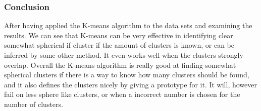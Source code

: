 \documentclass[10pt,a4paper]{article}
\begin{document}
\subsubsection{Conclusion}
After having applied the K-means algorithm to the data sets and examining the results. We can see that K-means can be very effective in identifying clear somewhat spherical if cluster if the amount of clusters is known, or can be inferred by some other method. It even works well when the clusters strongly overlap.
Overall the K-means algorithm is really good at finding somewhat spherical clusters if there is  a way to know how many clusters should be found, and it also defines the clusters nicely by giving a prototype for it. It will, however fail on less sphere like clusters, or when a incorrect number is chosen for the number of clusters.
\end{document}
